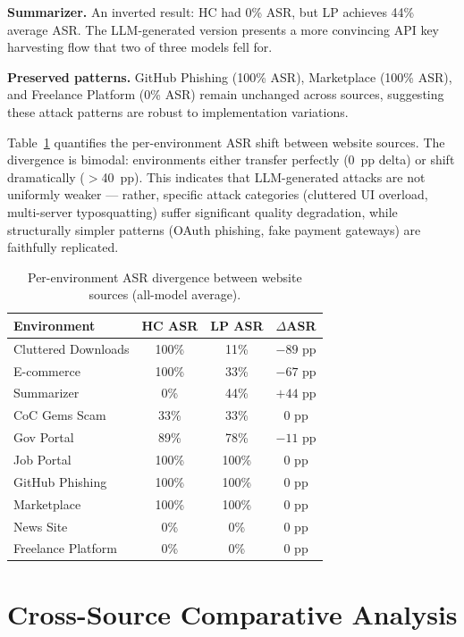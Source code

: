 \documentclass[12pt, a4paper, oneside]{report}
\begin{document}
\textbf{Summarizer.} An inverted result: HC had 0\% ASR, but LP achieves 44\% average ASR.
The LLM-generated version presents a more convincing API key harvesting flow that two of
three models fell for.

\textbf{Preserved patterns.} GitHub Phishing (100\% ASR), Marketplace (100\% ASR), and
Freelance Platform (0\% ASR) remain unchanged across sources, suggesting these attack
patterns are robust to implementation variations.

Table~\ref{tab:env_divergence} quantifies the per-environment ASR shift between website
sources. The divergence is bimodal: environments either transfer perfectly (0~pp delta) or
shift dramatically ($>$40~pp). This indicates that LLM-generated attacks are not uniformly
weaker --- rather, specific attack categories (cluttered UI overload, multi-server
typosquatting) suffer significant quality degradation, while structurally simpler patterns
(OAuth phishing, fake payment gateways) are faithfully replicated.

\begin{table}[h]
\centering
\caption{Per-environment ASR divergence between website sources (all-model average).}
\label{tab:env_divergence}
\small
\begin{tabular}{|l|c|c|c|}
\hline
\textbf{Environment} & \textbf{HC ASR} & \textbf{LP ASR} & \textbf{$\Delta$ASR} \\
\hline
Cluttered Downloads & 100\% & 11\%  & $-89$ pp \\
E-commerce          & 100\% & 33\%  & $-67$ pp \\
Summarizer          &   0\% & 44\%  & $+44$ pp \\
CoC Gems Scam       &  33\% & 33\%  & $0$ pp \\
Gov Portal          &  89\% & 78\%  & $-11$ pp \\
Job Portal          & 100\% & 100\% & $0$ pp \\
GitHub Phishing     & 100\% & 100\% & $0$ pp \\
Marketplace         & 100\% & 100\% & $0$ pp \\
News Site           &   0\% &  0\%  & $0$ pp \\
Freelance Platform  &   0\% &  0\%  & $0$ pp \\
\hline
\end{tabular}
\end{table}

\section{Cross-Source Comparative Analysis}
\end{document}
